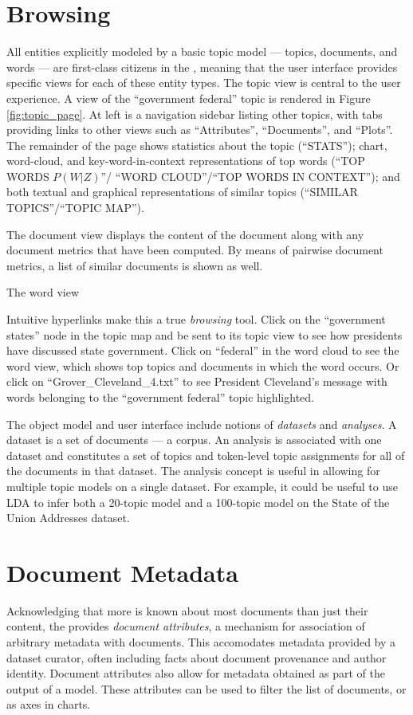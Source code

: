 \documentclass[11pt]{article}
\begin{document}
\section{Browsing}%
All entities explicitly modeled by a basic topic model --- topics, documents,
and words --- are first-class citizens in the \tool, meaning that the user
interface provides specific views for each of these entity types. The topic view
is central to the user experience. A view of the ``government federal'' topic is
rendered in Figure \ref{fig:topic_page}. At left is a navigation sidebar listing other topics,
with tabs providing links to other views such as ``Attributes'', ``Documents'', and ``Plots''.
The remainder of the page shows statistics about the topic
(``STATS''); chart, word-cloud, and key-word-in-context representations of top
words (``TOP WORDS $P(W|Z)$''/ ``WORD CLOUD''/``TOP WORDS IN CONTEXT''); and
both textual and graphical representations of similar topics (``SIMILAR
TOPICS''/``TOPIC MAP'').

The document view displays the content of the document along with any document
metrics that have been computed. By means of pairwise document metrics,
a list of similar documents is shown as well.

The word view

Intuitive hyperlinks make this a true \textit{browsing} tool. Click on the
``government states'' node in the topic map and be sent to its topic view to see
how presidents have discussed state government. Click on ``federal'' in the word
cloud to see the word view, which shows top topics and documents in which the
word occurs. Or click on ``Grover\_\allowbreak{}Cleveland\_4.txt''
to see President Cleveland's message with words belonging to the ``government federal''
topic highlighted.

The \tool{} object model and user interface include notions of
\textit{datasets} and \textit{analyses}.
A dataset is a set of documents --- a corpus. An analysis is associated with one
dataset and constitutes a set of topics and token-level topic assignments for
all of the documents in that dataset. The analysis concept is useful in
allowing for multiple topic models on a single dataset. For example,
it could be useful to use LDA to infer both a 20-topic model and a 100-topic model
on the State of the Union Addresses dataset.

\section{Document Metadata}
Acknowledging that more is known about most documents than just their content,
the \tool{} provides \textit{document attributes}, a mechanism for association
of arbitrary metadata with documents. This accomodates metadata
provided by a dataset curator, often including facts about document
provenance and author identity. Document attributes also allow for metadata
obtained as part of the output of a model. These attributes can be used to
filter the list of documents, or as axes in charts.
\end{document}
